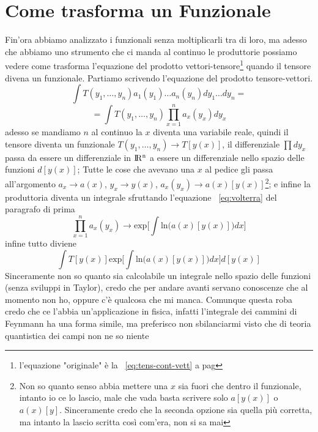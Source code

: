 \documentclass[11pt,a4paper]{report}
\theoremstyle{definition}
\theoremstyle{plain}
\theoremstyle{plain}
\begin{document}
		\section{Come trasforma un Funzionale}
			Fin'ora abbiamo analizzato i funzionali senza moltiplicarli tra di loro, ma adesso che abbiamo uno strumento che ci manda al continuo le produttorie possiamo vedere come trasforma l'equazione del prodotto vettori-tensore\footnote{l'equazione "originale" è la ~\ref{eq:tens-cont-vett} a pag \pageref{eq:tens-cont-vett}} quando il tensore divena un funzionale.\newline
			Partiamo scrivendo l'equazione del prodotto tensore-vettori.
			\begin{equation}
				\int T(y_1,\dots,y_n)a_1(y_1)\dots a_n(y_n)dy_1\dots dy_n=
			\end{equation}
			\[
				=\int T(y_1,\dots,y_n)\prod_{x=1}^n a_x(y_x)dy_x
			\]
			adesso se mandiamo $n$ al continuo la $x$ diventa una variabile reale, quindi il tensore diventa un funzionale $T(y_1,\dots,y_n)\rightarrow T[y(x)]$, il differenziale $\prod dy_x$ passa da essere un differenziale in $\rm I\!R^n$ a essere un differenziale nello spazio delle funzioni $d[y(x)]$;\newline
			Tutte le cose che avevano una $x$ al pedice gli passa all'argomento $a_x\rightarrow a(x)$, $y_x\rightarrow y(x)$, $a_x(y_x)\rightarrow a(x)[y(x)]$\footnote{Non so quanto senso abbia mettere una $x$ sia fuori che dentro il funzionale, intanto io ce lo lascio, male che vada basta scrivere solo $a[y(x)]$ o $a(x)[y]$. Sinceramente credo che la seconda opzione sia quella più corretta, ma intanto la lascio scritta così com'era, non si sa mai}; e infine la produttoria diventa un integrale sfruttando l'equazione ~\ref{eq:volterra} del paragrafo di prima 
			\[
				\prod_{x=1}^n a_x(y_x)\rightarrow\textrm{exp}\bigg[\int \textrm{ln}\big(a(x)[y(x)]\big)dx\bigg]
			\]
			infine tutto diviene
			\begin{equation}
				\int T[y(x)]\textrm{exp}\bigg[\int \textrm{ln}\big(a(x)[y(x)]\big)dx\bigg]d[y(x)]
			\end{equation}
			Sinceramente non so quanto sia calcolabile un integrale nello spazio delle funzioni (senza sviluppi in Taylor), credo che per andare avanti servano conoscenze che al momento non ho, oppure c'è qualcosa che mi manca.\newline
			Comunque questa roba credo che ce l'abbia un'applicazione in fisica, infatti l'integrale dei cammini di Feynmann ha una forma simile, ma preferisco non sbilanciarmi visto che di teoria quantistica dei campi non ne so niente
\end{document}

